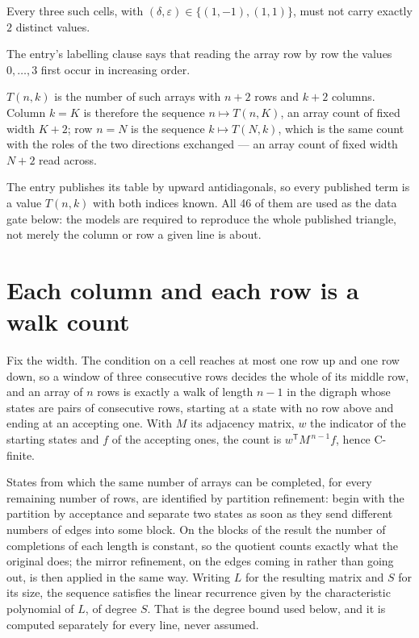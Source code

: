 \documentclass[11pt]{article}
\theoremstyle{definition}
\begin{document}
Every three such cells, with $(\delta,\varepsilon) \in \{(1,-1), (1,1)\}$, must not carry exactly $2$ distinct values.

The entry's labelling clause says that reading the array row by row the values $0,\dots,3$ first occur in increasing order.

$T(n,k)$ is the number of such arrays with $n + 2$ rows and $k + 2$ columns. Column $k = K$ is therefore the sequence $n \mapsto T(n,K)$, an array count of fixed width $K + 2$; row $n = N$ is the sequence $k \mapsto T(N,k)$, which is the same count with the roles of the two directions exchanged --- an array count of fixed width $N + 2$ read across.

The entry publishes its table by upward antidiagonals, so every published term is a value $T(n,k)$ with both indices known. All 46 of them are used as the data gate below: the models are required to reproduce the whole published triangle, not merely the column or row a given line is about.

\section{Each column and each row is a walk count}

Fix the width. The condition on a cell reaches at most one row up and one row down, so a window of three consecutive rows decides the whole of its middle row, and an array of $n$ rows is exactly a walk of length $n-1$ in the digraph whose states are pairs of consecutive rows, starting at a state with no row above and ending at an accepting one. With $M$ its adjacency matrix, $w$ the indicator of the starting states and $f$ of the accepting ones, the count is $w^{\mathsf T}M^{\,n-1}f$, hence C-finite.

States from which the same number of arrays can be completed, for every remaining number of rows, are identified by partition refinement: begin with the partition by acceptance and separate two states as soon as they send different numbers of edges into some block. On the blocks of the result the number of completions of each length is constant, so the quotient counts exactly what the original does; the mirror refinement, on the edges coming in rather than going out, is then applied in the same way. Writing $L$ for the resulting matrix and $S$ for its size, the sequence satisfies the linear recurrence given by the characteristic polynomial of $L$, of degree $S$. That is the degree bound used below, and it is computed separately for every line, never assumed.
\end{document}
